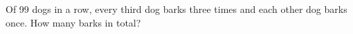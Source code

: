Of 99 dogs in a row, every third dog barks three times and each other dog barks once. How many barks in total?
